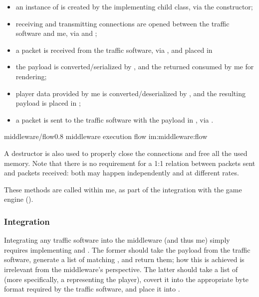 \begin{itemize}
	\item an instance of  is created by the implementing child class, via the  constructor;
	\item receiving and transmitting connections are opened between the traffic software and \gls{me}, via  and ;
	\item a packet is received from the traffic software, via , and placed in 
	\item the payload is converted/serialized by , and the returned  consumed by \gls{me} for rendering;
	\item player data provided by \gls{me} is converted/deserialized by , and the resulting payload is placed in ;
	\item a packet is sent to the traffic software with the payload in , via .
\end{itemize}

\begin{image}
	{middleware/flow}{0.8}
	{\gls{middleware} execution flow}
	{im:middleware:flow}
	{}
\end{image}

A destructor is also used to properly close the connections and free all the used memory. Note that there is no requirement for a 1:1 relation between packets sent and packets received: both may happen independently and at different rates.

These methods are called within \gls{me}, as part of the integration with the game engine ().

\subsubsection{Integration}

Integrating any traffic software into the \gls{middleware} (and thus \gls{me}) simply requires implementing  and . The former should take the payload from the traffic software, generate a list of matching , and return them; how this is achieved is irrelevant from the \gls{middleware}'s perspective. The latter should take a list of  (more specifically, a  representing the player), covert it into the appropriate byte format required by the traffic software, and place it into .


